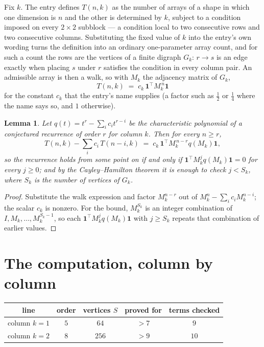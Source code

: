 \documentclass[11pt,a4paper]{article}
\theoremstyle{plain}
\newtheorem{lemma}[theorem]{Lemma}
\theoremstyle{definition}
\begin{document}
Fix $k$. The entry defines $T(n,k)$ as the number of arrays of a shape in which one dimension
is $n$ and the other is determined by $k$, subject to a condition imposed on every
$2\times2$ subblock --- a condition local to two consecutive rows and two consecutive columns.
Substituting the fixed value of $k$ into the entry's own wording turns the definition into an
ordinary one-parameter array count, and for such a count the rows are the vertices of a finite
digraph $G_k$: $r\to s$ is an edge exactly when placing $s$ under $r$ satisfies the condition
in every column pair. An admissible array is then a walk, so with $M_k$ the adjacency matrix
of $G_k$,
\[
T(n,k)\;=\;c_k\,\mathbf{1}^{\!\top}M_k^{\,n}\mathbf{1}
\]
for the constant $c_k$ that the entry's name supplies (a factor such as $\tfrac12$ or
$\tfrac14$ where the name says so, and $1$ otherwise).

\begin{lemma}\label{lem:crit}
Let $q(t)=t^{r}-\sum_i c_it^{r-i}$ be the characteristic polynomial of a conjectured
recurrence of order $r$ for column $k$. Then for every $n\ge r$,
\[
T(n,k)-\sum_i c_i\,T(n-i,k)\;=\;c_k\,\mathbf{1}^{\!\top}M_k^{\,n-r}q(M_k)\mathbf{1},
\]
so the recurrence holds from some point on if and only if
$\mathbf{1}^{\!\top}M_k^{j}q(M_k)\mathbf{1}=0$ for every $j\ge0$; and by the
Cayley--Hamilton theorem it is enough to check $j<S_k$, where $S_k$ is the number of vertices
of $G_k$.
\end{lemma}

\begin{proof}
Substitute the walk expression and factor $M_k^{n-r}$ out of $M_k^{n}-\sum_ic_iM_k^{n-i}$;
the scalar $c_k$ is nonzero. For the bound, $M_k^{S_k}$ is an integer combination of
$I,M_k,\dots,M_k^{S_k-1}$, so each $\mathbf{1}^{\!\top}M_k^{j}q(M_k)\mathbf{1}$ with
$j\ge S_k$ repeats that combination of earlier values.
\end{proof}

\section{The computation, column by column}

\begin{center}
\begin{tabular}{ccccc}
line & order & vertices $S$ & proved for & terms checked \\ \hline
column $k$$=1$ & $5$ & $64$ & $>7$ & $9$ \\
column $k$$=2$ & $8$ & $256$ & $>9$ & $10$ \\
\end{tabular}
\end{center}
\end{document}
